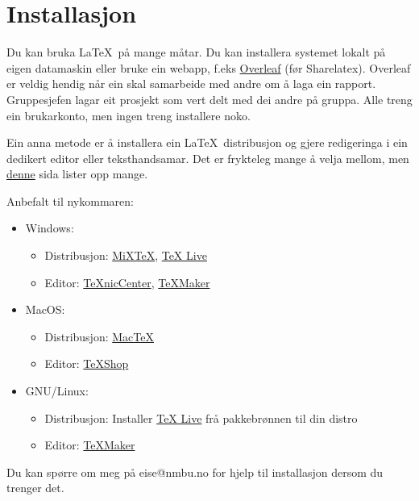 \documentclass[11pt,twocolumn]{article}
\begin{document}
\section*{Installasjon}
Du kan bruka \LaTeX\ på mange måtar. Du kan installera systemet lokalt
på eigen datamaskin eller bruke ein webapp, f.eks
\href{www.overleaf.com}{Overleaf} (før Sharelatex). Overleaf er veldig
hendig når ein skal samarbeide med andre om å laga ein
rapport. Gruppesjefen lagar eit prosjekt som vert delt med dei andre
på gruppa. Alle treng ein brukarkonto, men ingen treng installere
noko.

Ein anna metode er å installera ein \LaTeX\ distribusjon og gjere
redigeringa i ein dedikert editor eller teksthandsamar. Det er
frykteleg mange å velja mellom, men
\href{https://tex.stackexchange.com/questions/339/latex-editors-ides}{denne}
sida lister opp mange.

Anbefalt til nykommaren:
\begin{itemize}
  \item Windows:
    \begin{itemize}
      \item Distribusjon: \href{https://miktex.org}{MiXTeX}, \href{http://www.tug.org/texlive/}{TeX Live}
      \item Editor: \href{http://www.texniccenter.org}{TeXnicCenter}, \href{http://www.xm1math.net/texmaker/}{TeXMaker}
    \end{itemize}
  \item MacOS:
    \begin{itemize}
      \item Distribusjon: \href{http://www.tug.org/mactex/}{MacTeX}
      \item Editor: \href{http://pages.uoregon.edu/koch/texshop/}{TeXShop}
    \end{itemize}
  \item GNU/Linux:
    \begin{itemize}
      \item Distribusjon: Installer \href{http://www.tug.org/texlive/}{TeX Live} frå pakkebrønnen til din distro
      \item Editor: \href{http://www.xm1math.net/texmaker/}{TeXMaker}
    \end{itemize}
\end{itemize}

Du kan spørre om meg på eise@nmbu.no for hjelp til installasjon dersom
du trenger det.



\end{document}
